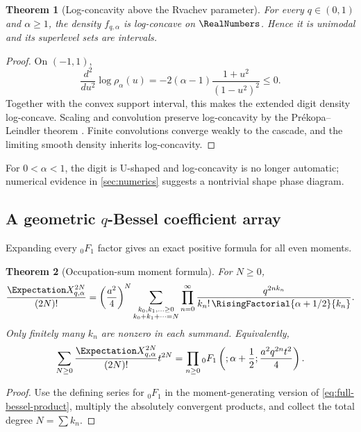 \documentclass[11pt]{article}
\newtheorem{theorem}{Theorem}[section]
\theoremstyle{definition}
\theoremstyle{remark}
\begin{document}
\begin{theorem}[Log-concavity above the Rvachev parameter]
\label{thm:log-concavity}
For every \(q\in(0,1)\) and \(\alpha\ge1\), the density
\(f_{q,\alpha}\) is log-concave on \(\RealNumbers\).  Hence it is unimodal and its
superlevel sets are intervals.
\end{theorem}

\begin{proof}
On \((-1,1)\),
\[
 \frac{d^2}{du^2}\log\rho_\alpha(u)
 =-2(\alpha-1)\frac{1+u^2}{(1-u^2)^2}\le0.
\]
Together with the convex support interval, this makes the extended digit
density log-concave.  Scaling and convolution preserve log-concavity by the
Pr\'ekopa--Leindler theorem \cite{Prekopa}.  Finite convolutions converge weakly to the
cascade, and the limiting smooth density inherits log-concavity.
\end{proof}

For \(0<\alpha<1\), the digit is U-shaped and log-concavity is no longer
automatic; numerical evidence in \cref{sec:numerics} suggests a nontrivial
shape phase diagram.

\subsection{A geometric \(q\)-Bessel coefficient array}

Expanding every \({}_0F_1\) factor gives an exact positive formula for all
even moments.

\begin{theorem}[Occupation-sum moment formula]
\label{thm:occupation-sum}
For \(N\ge0\),
\begin{equation}
 \frac{\Expectation X_{q,\alpha}^{2N}}{(2N)!}
 =\left(\frac{a^2}{4}\right)^N
 \sum_{\substack{k_0,k_1,\ldots\ge0\\k_0+k_1+\cdots=N}}
 \prod_{n=0}^{\infty}
 \frac{q^{2nk_n}}{k_n!\,\RisingFactorial{\alpha+1/2}{k_n}}.
 \label{eq:occupation-moment}
\end{equation}
Only finitely many \(k_n\) are nonzero in each summand.  Equivalently,
\begin{equation}
 \sum_{N\ge0}\frac{\Expectation X_{q,\alpha}^{2N}}{(2N)!}t^{2N}
 =\prod_{n\ge0}{}_0F_1\left(;\alpha+\frac12;
 \frac{a^2q^{2n}t^2}{4}\right).
 \label{eq:mgf-hypergeometric-product}
\end{equation}
\end{theorem}

\begin{proof}
Use the defining series for \({}_0F_1\) in the moment-generating version of
\eqref{eq:full-bessel-product}, multiply the absolutely convergent products,
and collect the total degree \(N=\sum k_n\).
\end{proof}
\end{document}
